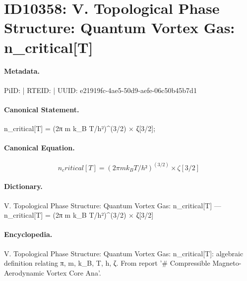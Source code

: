 \section*{ID10358: V. Topological Phase Structure: Quantum Vortex Gas: n\_critical[T]}
\paragraph{Metadata.}
PiID:  | RTEID:  | UUID: e21919fc-4ae5-50d9-aefe-06c50b45b7d1

\paragraph{Canonical Statement.}
n\_critical[T] = (2π m k\_B T/h²)\textasciicircum{}(3/2) × ζ[3/2];

\paragraph{Canonical Equation.}
\[
n_critical[T] = (2π m k_B T/h²)^(3/2) × ζ[3/2]
\]

\paragraph{Dictionary.}
V. Topological Phase Structure: Quantum Vortex Gas: n\_critical[T] — n\_critical[T] = (2π m k\_B T/h²)\textasciicircum{}(3/2) × ζ[3/2]

\paragraph{Encyclopedia.}
V. Topological Phase Structure: Quantum Vortex Gas: n\_critical[T]: algebraic definition relating π, m, k\_B, T, h, ζ. From report '\# Compressible Magneto-Aerodynamic Vortex Core Ana'.
